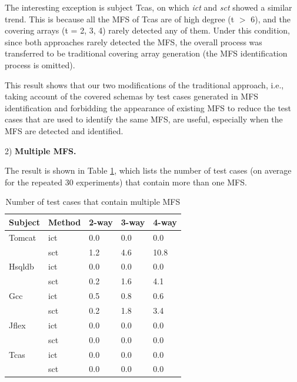 \documentclass[journal,12pt,onecolumn,draftclsnofoot,]{IEEEtran}
\begin{document}
The interesting exception is subject Tcas, on which \emph{ict} and \emph{sct} showed a similar trend. This is because all the MFS of Tcas are of high degree (t $>$ 6), and the covering arrays (t = 2, 3, 4) rarely detected any of them. Under this condition, since both approaches rarely detected the MFS, the overall process was transferred to be traditional covering array generation (the MFS identification process is omitted).

This result shows that our two modifications of the traditional approach, i.e., taking account of the covered schemas by test cases generated in MFS identification and forbidding the appearance of existing MFS to reduce the test cases that are used to identify the same MFS, are useful, especially when the MFS are detected and identified.

2) \textbf{Multiple MFS.}

The result is shown in Table \ref{multi_mfs}, which lists the number of test cases (on average for the repeated 30 experiments) that contain more than one MFS.

\begin{table}[ht]
\centering
\caption{Number of test cases that contain multiple MFS}
\label{multi_mfs}
\begin{tabular}{|ll|lll|}
\hline
Subject & Method & 2-way       & 3-way       & 4-way       \\ \hline
Tomcat	&ict	&0.0	&0.0	&0.0	\\
	&sct	&1.2	&4.6	&10.8	\\\hline
Hsqldb	&ict	&0.0	&0.0	&0.0	\\
	&sct	&0.2	&1.6	&4.1	\\\hline
Gcc	&ict	&0.5	&0.8	&0.6	\\
	&sct	&0.2	&1.8	&3.4	\\\hline
Jflex	&ict	&0.0	&0.0	&0.0	\\
	&sct	&0.0	&0.0	&0.0	\\\hline
Tcas	&ict	&0.0	&0.0	&0.0	\\
	&sct	&0.0	&0.0	&0.0	\\\hline
\end{tabular}
\end{table}
\end{document}
